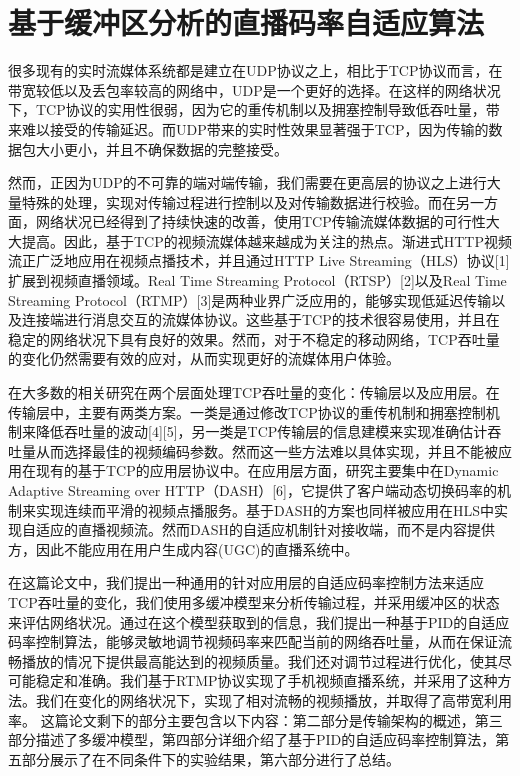 \chapter{基于缓冲区分析的直播码率自适应算法}

很多现有的实时流媒体系统都是建立在UDP协议之上，相比于TCP协议而言，在带宽较低以及丢包率较高的网络中，UDP是一个更好的选择。在这样的网络状况下，TCP协议的实用性很弱，因为它的重传机制以及拥塞控制导致低吞吐量，带来难以接受的传输延迟。而UDP带来的实时性效果显著强于TCP，因为传输的数据包大小更小，并且不确保数据的完整接受。

然而，正因为UDP的不可靠的端对端传输，我们需要在更高层的协议之上进行大量特殊的处理，实现对传输过程进行控制以及对传输数据进行校验。而在另一方面，网络状况已经得到了持续快速的改善，使用TCP传输流媒体数据的可行性大大提高。因此，基于TCP的视频流媒体越来越成为关注的热点。渐进式HTTP视频流正广泛地应用在视频点播技术，并且通过HTTP Live Streaming（HLS）协议[1]扩展到视频直播领域。Real Time Streaming Protocol（RTSP）[2]以及Real Time Streaming Protocol（RTMP）[3]是两种业界广泛应用的，能够实现低延迟传输以及连接端进行消息交互的流媒体协议。这些基于TCP的技术很容易使用，并且在稳定的网络状况下具有良好的效果。然而，对于不稳定的移动网络，TCP吞吐量的变化仍然需要有效的应对，从而实现更好的流媒体用户体验。

在大多数的相关研究在两个层面处理TCP吞吐量的变化：传输层以及应用层。在传输层中，主要有两类方案。一类是通过修改TCP协议的重传机制和拥塞控制机制来降低吞吐量的波动[4][5]，另一类是TCP传输层的信息建模来实现准确估计吞吐量从而选择最佳的视频编码参数。然而这一些方法难以具体实现，并且不能被应用在现有的基于TCP的应用层协议中。在应用层方面，研究主要集中在Dynamic Adaptive Streaming over HTTP（DASH）[6]，它提供了客户端动态切换码率的机制来实现连续而平滑的视频点播服务。基于DASH的方案也同样被应用在HLS中实现自适应的直播视频流。然而DASH的自适应机制针对接收端，而不是内容提供方，因此不能应用在用户生成内容(UGC)的直播系统中。

在这篇论文中，我们提出一种通用的针对应用层的自适应码率控制方法来适应TCP吞吐量的变化，我们使用多缓冲模型来分析传输过程，并采用缓冲区的状态来评估网络状况。通过在这个模型获取到的信息，我们提出一种基于PID的自适应码率控制算法，能够灵敏地调节视频码率来匹配当前的网络吞吐量，从而在保证流畅播放的情况下提供最高能达到的视频质量。我们还对调节过程进行优化，使其尽可能稳定和准确。我们基于RTMP协议实现了手机视频直播系统，并采用了这种方法。我们在变化的网络状况下，实现了相对流畅的视频播放，并取得了高带宽利用率。
这篇论文剩下的部分主要包含以下内容：第二部分是传输架构的概述，第三部分描述了多缓冲模型，第四部分详细介绍了基于PID的自适应码率控制算法，第五部分展示了在不同条件下的实验结果，第六部分进行了总结。

